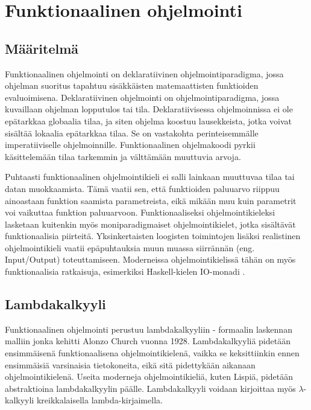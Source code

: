 \chapter{Funktionaalinen ohjelmointi} \label{Funktionaalinen ohjelmointi}

\section{Määritelmä}
Funktionaalinen ohjelmointi on deklaratiivinen ohjelmointiparadigma, jossa ohjelman suoritus tapahtuu sisäkkäisten
matemaattisten funktioiden evaluoimisena. Deklaratiivinen ohjelmointi on ohjelmointiparadigma, jossa kuvaillaan ohjelman
lopputulos tai tila. Deklaratiivisessa ohjelmoinnissa ei ole epätarkkaa globaalia tilaa, ja siten ohjelma koostuu
lausekkeista, jotka voivat sisältää lokaalia epätarkkaa tilaa. Se on vastakohta perinteisemmälle imperatiiviselle 
ohjelmoinnille. Funktionaalinen ohjelmakoodi pyrkii käsittelemään tilaa tarkemmin ja välttämään muuttuvia
arvoja. \cite{hudak}

Puhtaasti funktionaalinen ohjelmointikieli ei salli lainkaan muuttuvaa tilaa tai datan muokkaamista. Tämä vaatii sen,
että funktioiden paluuarvo riippuu ainoastaan funktion saamista parametreista, eikä mikään muu kuin parametrit voi
vaikuttaa funktion paluuarvoon. Funktionaaliseksi ohjelmointikieleksi lasketaan kuitenkin myös moniparadigmaiset
ohjelmointikielet, jotka sisältävät funktionaalisia piirteitä. Yksinkertaisten loogisten toimintojen lisäksi realistinen
ohjelmointikieli vaatii epäpuhtauksia muun muassa siirrännän (eng. Input/Output) toteuttamiseen. \cite{purelyFunctional}
Moderneissa ohjelmointikielissä tähän on myös funktionaalisia ratkaisuja, esimerkiksi Haskell-kielen
IO-monadi \cite{learnhaskell}.

\section{Lambdakalkyyli}
Funktionaalinen ohjelmointi perustuu lambdakalkyyliin - formaalin laskennan malliin jonka kehitti Alonzo Church vuonna
1928. Lambdakalkyyliä pidetään ensimmäisenä funktionaalisena ohjelmointikielenä, vaikka se keksittiinkin ennen
ensimmäisiä varsinaisia tietokoneita, eikä sitä pidettykään aikanaan ohjelmointikielenä. Useita moderneja
ohjelmointikieliä, kuten Lispiä, pidetään abstraktioina lambdakalkyylin päälle. Lambdakalkyyli voidaan kirjoittaa myös
$ \lambda $-kalkyyli kreikkalaisella lambda-kirjaimella. \cite{hudak}

